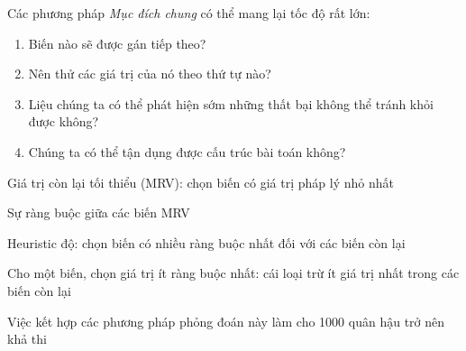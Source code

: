 \documentclass{article}
\begin{document}
\begin{huge}

\maxfigwidth
{}


Các phương pháp \emph{Mục đích chung} có thể mang lại tốc độ rất lớn:
\begin{enumerate}
\item Biến nào sẽ được gán tiếp theo?
\item Nên thử các giá trị của nó theo thứ tự nào?
\item Liệu chúng ta có thể phát hiện sớm những thất bại không thể tránh khỏi được không?
\item Chúng ta có thể tận dụng được cấu trúc bài toán không?
\end{enumerate}


Giá trị còn lại tối thiểu (MRV):\al
   chọn biến có giá trị pháp lý nhỏ nhất

\vspace*{0.3in}

\maxfigwidth
{}


Sự ràng buộc giữa các biến MRV

Heuristic độ: \al
   chọn biến có nhiều ràng buộc nhất đối với các biến còn lại

\vspace*{0.3in}

\maxfigwidth
{}


Cho một biến, chọn giá trị ít ràng buộc nhất:\al
   cái loại trừ ít giá trị nhất trong các biến còn lại

\vspace*{0.3in}

\maxfigwidth
{}

Việc kết hợp các phương pháp phỏng đoán này làm cho 1000 quân hậu trở nên khả thi





\end{huge}
\end{document}

